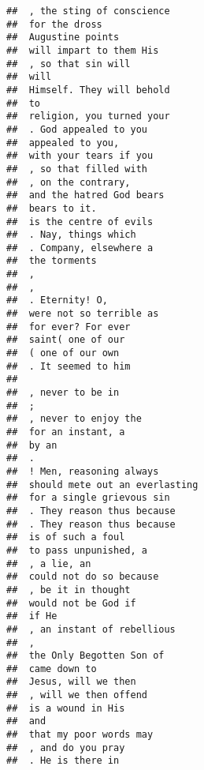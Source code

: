 \documentclass[]{article}
\begin{document}
\begin{verbatim}
##  , the sting of conscience               
##  for the dross                           
##  Augustine points                        
##  will impart to them His                 
##  , so that sin will                      
##  will                                    
##  Himself. They will behold               
##  to                                      
##  religion, you turned your               
##  . God appealed to you                   
##  appealed to you,                        
##  with your tears if you                  
##  , so that filled with                   
##  , on the contrary,                      
##  and the hatred God bears                
##  bears to it.                            
##  is the centre of evils                  
##  . Nay, things which                     
##  . Company, elsewhere a                  
##  the torments                            
##  ,                                       
##  ,                                       
##  . Eternity! O,                          
##  were not so terrible as                 
##  for ever? For ever                      
##  saint( one of our                       
##  ( one of our own                        
##  . It seemed to him                      
##                                          
##  , never to be in                        
##  ;                                       
##  , never to enjoy the                    
##  for an instant, a                       
##  by an                                   
##  .                                       
##  ! Men, reasoning always                 
##  should mete out an everlasting          
##  for a single grievous sin               
##  . They reason thus because              
##  . They reason thus because              
##  is of such a foul                       
##  to pass unpunished, a                   
##  , a lie, an                             
##  could not do so because                 
##  , be it in thought                      
##  would not be God if                     
##  if He                                   
##  , an instant of rebellious              
##  ,                                       
##  the Only Begotten Son of                
##  came down to                            
##  Jesus, will we then                     
##  , will we then offend                   
##  is a wound in His                       
##  and                                     
##  that my poor words may                  
##  , and do you pray                       
##  . He is there in                        

\end{verbatim}
\end{document}
